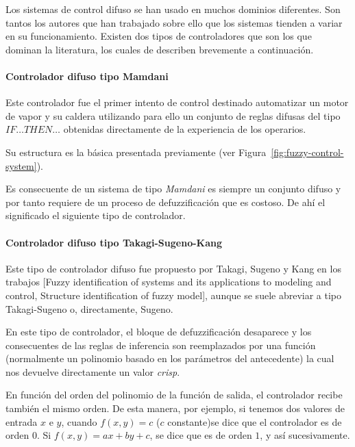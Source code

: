 Los sistemas de control difuso se han usado en muchos dominios diferentes. Son tantos los autores que han trabajado sobre ello que los sistemas tienden a variar en su funcionamiento. Existen dos tipos de controladores que son los que dominan la literatura, los cuales de describen brevemente a continuación.

\paragraph{Controlador difuso tipo Mamdani}

Este controlador fue el primer intento de control destinado automatizar un motor de vapor y su caldera utilizando para ello un conjunto de reglas difusas del tipo \texttt{$IF \ldots THEN \ldots$} obtenidas directamente de la experiencia de los operarios.

Su estructura es la básica presentada previamente (ver Figura~\ref{fig:fuzzy-control-system}).

Es consecuente de un sistema de tipo \textit{Mamdani} es siempre un conjunto difuso y por tanto requiere de un proceso de defuzzificación que es costoso. De ahí el significado el siguiente tipo de controlador.

\paragraph{Controlador difuso tipo Takagi-Sugeno-Kang}

Este tipo de controlador difuso fue propuesto por Takagi, Sugeno y Kang en los trabajos [Fuzzy identification of systems and its applications to modeling and control, Structure identification of fuzzy model], aunque se suele abreviar a tipo Takagi-Sugeno o, directamente, Sugeno.

En este tipo de controlador, el bloque de defuzzificación desaparece y los consecuentes de las reglas de inferencia son reemplazados por una función (normalmente un polinomio basado en los parámetros del antecedente) la cual nos devuelve directamente un valor \textit{crisp}.

En función del orden del polinomio de la función de salida, el controlador recibe también el mismo orden. De esta manera, por ejemplo, si tenemos dos valores de entrada $x$ e $y$, cuando $f(x, y) = c$ ($c$ constante)se dice que el controlador es de orden $0$. Si $f(x, y) = ax + by + c$, se dice que es de orden $1$, y así sucesivamente.

